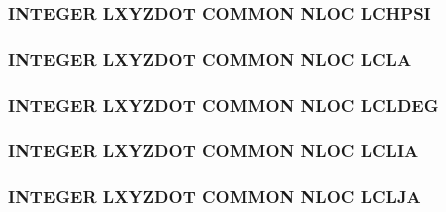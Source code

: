 \hypertarget{nloc_8com_a8764a03c9a3d37242bf263951a9b72fe}{
\subsubsection[{L\-C\-H\-P\-S\-I}]{\setlength{\rightskip}{0pt plus 5cm}I\-N\-T\-E\-G\-E\-R L\-X\-Y\-Z\-D\-O\-T C\-O\-M\-M\-O\-N N\-L\-O\-C L\-C\-H\-P\-S\-I}}\label{nloc_8com_a8764a03c9a3d37242bf263951a9b72fe}
\hypertarget{nloc_8com_a6a7facc1bafbe15e7a64356336cbf970}{
\subsubsection[{L\-C\-L\-A}]{\setlength{\rightskip}{0pt plus 5cm}I\-N\-T\-E\-G\-E\-R L\-X\-Y\-Z\-D\-O\-T C\-O\-M\-M\-O\-N N\-L\-O\-C L\-C\-L\-A}}\label{nloc_8com_a6a7facc1bafbe15e7a64356336cbf970}
\hypertarget{nloc_8com_a63ce6a58e71c59904b91171f31e311f4}{
\subsubsection[{L\-C\-L\-D\-E\-G}]{\setlength{\rightskip}{0pt plus 5cm}I\-N\-T\-E\-G\-E\-R L\-X\-Y\-Z\-D\-O\-T C\-O\-M\-M\-O\-N N\-L\-O\-C L\-C\-L\-D\-E\-G}}\label{nloc_8com_a63ce6a58e71c59904b91171f31e311f4}
\hypertarget{nloc_8com_a94e3dae076b855d560e7a19444d9cdb9}{
\subsubsection[{L\-C\-L\-I\-A}]{\setlength{\rightskip}{0pt plus 5cm}I\-N\-T\-E\-G\-E\-R L\-X\-Y\-Z\-D\-O\-T C\-O\-M\-M\-O\-N N\-L\-O\-C L\-C\-L\-I\-A}}\label{nloc_8com_a94e3dae076b855d560e7a19444d9cdb9}
\hypertarget{nloc_8com_af7aee801d75be31ba1a749e75b742b1f}{
\subsubsection[{L\-C\-L\-J\-A}]{\setlength{\rightskip}{0pt plus 5cm}I\-N\-T\-E\-G\-E\-R L\-X\-Y\-Z\-D\-O\-T C\-O\-M\-M\-O\-N N\-L\-O\-C L\-C\-L\-J\-A}}\label{nloc_8com_af7aee801d75be31ba1a749e75b742b1f}
